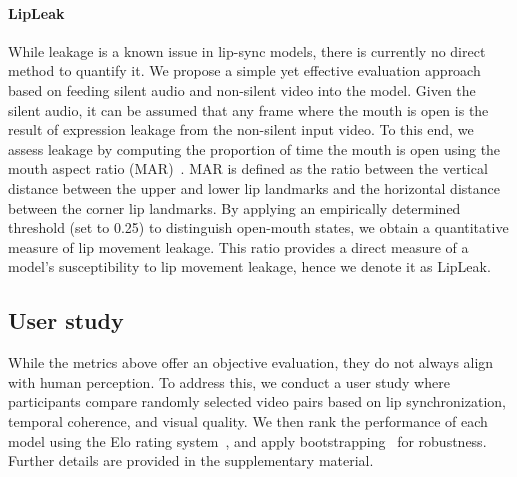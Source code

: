 \paragraph{LipLeak} While leakage is a known issue in lip-sync models, there is currently no direct method to quantify it. We propose a simple yet effective evaluation approach based on feeding silent audio and non-silent video into the model. Given the silent audio, it can be assumed that any frame where the mouth is open is the result of expression leakage from the non-silent input video. To this end, we assess leakage by computing the proportion of time the mouth is open using the mouth aspect ratio (MAR)~\cite{mouthopen}. MAR is defined as the ratio between the vertical distance between the upper and lower lip landmarks and the horizontal distance between the corner lip landmarks. By applying an empirically determined threshold (set to 0.25) to distinguish open-mouth states, we obtain a quantitative measure of lip movement leakage. This ratio provides a direct measure of a model’s susceptibility to lip movement leakage, hence we denote it as LipLeak.

\subsection{User study}

While the metrics above offer an objective evaluation, they do not always align with human perception. To address this, we conduct a user study where participants compare randomly selected video pairs based on lip synchronization, temporal coherence, and visual quality. We then rank the performance of each model using the Elo rating system~\cite{elo1978rating}, and apply bootstrapping~\cite{chiang2024chatbot} for robustness. Further details are provided in the supplementary material.
